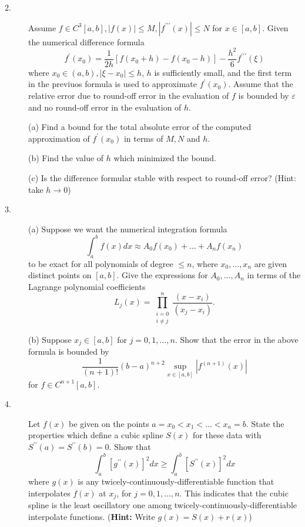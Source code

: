 \documentclass{article}
\begin{document}
\begin{description}
\begin{center}
\begin{small}
\begin{picture}
\end{picture}
\end{small}
\end{center}

\vspace{.5in}
\item[2.]
Assume $f \in C^3 [a,b], |f(x)| \leq M, |f^{\prime \prime \prime} (x) |
 \leq N$ for $x \in [a,b]$. Given the numerical difference formula
$$f^\prime (x_0) = \frac{1}{2h} [f(x_0 + h) - f(x_0 - h)] -
  \frac{h^2}{6} f^{\prime \prime \prime} (\xi)$$
where $x_0 \in (a,b), |\xi - x_0| \leq h$, $h$ is sufficiently small, and
the first term in the previuos formula is used to approximate
$f^\prime (x_0)$. Assume that the relative error due to round-off error
in the evaluation of $f$ is bounded by $\varepsilon$ and no round-off
error in the evaluation of $h$.

\item[\quad] (a)
Find a bound for the total absolute error of the computed approximation of
$f^\prime (x_0)$ in terms of $M,N$ and $h$.

\item[\quad] (b)
Find the value of $h$ which minimized the bound.

\item[\quad] (c)
Is the difference formular stable with respect to round-off error? (Hint:
take $h \to 0$)

\item[3.] (a)
Suppose we want the numerical integration formula
$$\int^b_a f(x) dx \approx A_0 f(x_0) + \dots + A_n f(x_n)$$
to be exact for all polynomials of degree $\leq n$, where $x_0, \dots, x_n$
are given distinct points on $[a,b]$. Give the expressions for
$A_0, \dots, A_n$ in terms of the Lagrange polynomial coefficients
$$L_j (x) = \prod^n_{\substack{i=0 \\i \neq j}}
  \frac{(x-x_i)}{(x_j-x_i)}.$$

\item[\quad] (b)
Suppose $x_j \in [a,b]$ for $j = 0,1, \dots, n$. Show that the error in the
above formula is bounded by
$$\frac{1}{(n+1)!} (b-a)^{n+2} \sup_{x \in [a,b]}
  |f^{(n+1)} (x) |$$
for $f \in C^{n+1} [a,b]$.

\item[4.]
Let $f(x)$ be given on the points $a= x_0 < x_1 < \dots < x_n = b$. State
the properties which define a cubic spline $S(x)$ for these data with
$S^{\prime \prime} (a) = S^{\prime \prime} (b) = 0$. Show that
$$\int^b_a \left[g^{\prime \prime} (x) \right]^2 dx \geq
  \int^b_a \left[S^{\prime \prime} (x) \right]^2 dx$$
where $g(x)$ is any twicely-continuously-differentiable function that
interpolates $f(x)$ at $x_j$, for $j= 0,1, \dots, n$. This indicates that
the cubic spline is the least oscillatory one among
twicely-continuously-differentiable interpolate functions. ({\bf Hint:}
Write $g(x) = S(x) + r(x)$)


\end{description}
\end{document}
